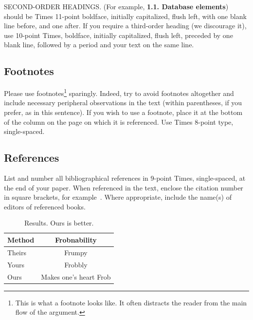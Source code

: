 \documentclass[10pt,twocolumn,letterpaper]{article}
\begin{document}
SECOND-ORDER HEADINGS. (For example, { \bf 1.1. Database elements})
should be Times 11-point boldface, initially capitalized, flush left,
with one blank line before, and one after. If you require a third-order
heading (we discourage it), use 10-point Times, boldface, initially
capitalized, flush left, preceded by one blank line, followed by a period
and your text on the same line.

\subsection{Footnotes}

Please use footnotes\footnote {This is what a footnote looks like.  It
often distracts the reader from the main flow of the argument.} sparingly.
Indeed, try to avoid footnotes altogether and include necessary peripheral
observations in
the text (within parentheses, if you prefer, as in this sentence).  If you
wish to use a footnote, place it at the bottom of the column on the page on
which it is referenced. Use Times 8-point type, single-spaced.


\subsection{References}

List and number all bibliographical references in 9-point Times,
single-spaced, at the end of your paper. When referenced in the text,
enclose the citation number in square brackets, for
example~\cite{Authors14}.  Where appropriate, include the name(s) of
editors of referenced books.

\begin{table}
\begin{center}
\begin{tabular}{|l|c|}
\hline
Method & Frobnability \\
\hline\hline
Theirs & Frumpy \\
Yours & Frobbly \\
Ours & Makes one's heart Frob\\
\hline
\end{tabular}
\end{center}
\caption{Results.   Ours is better.}
\end{table}

\end{document}
